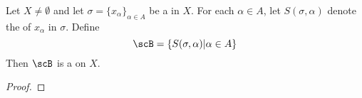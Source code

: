 \begin{prop}
    Let $X \neq \emptyset$ 
    and let $\sigma=\{x_\alpha\}_{\alpha \in A}$ 
    be a \Net in $X$. 
    For each $\alpha \in A$, let 
    $S(\sigma, \alpha)$ denote the 
    \NetSection
    of 
    $x_\alpha$ 
    in
    $\sigma$. 
    Define 
    \begin{equation*}
    \scB=\{S(\sigma, \alpha) | \alpha \in A \}
    \end{equation*}
    Then $\scB$ is a \FilterBase on $X$. 
    \begin{proof}
        
    \end{proof}
\end{prop}
